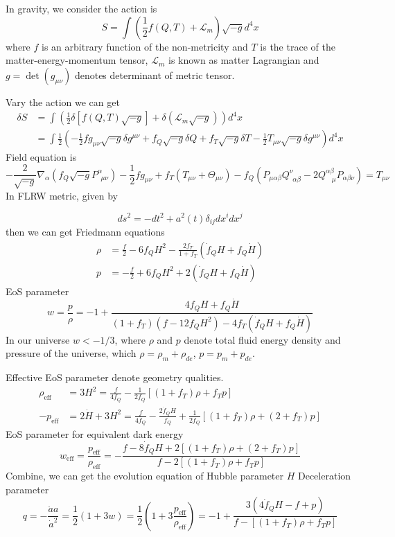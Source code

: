 \documentclass[linenumbers]{aastex631}
\begin{document}
In gravity, we consider the action is
\begin{equation}
S=\int(\frac{1}{2}f(Q,T)+\mathcal{L}_m) \sqrt{-g}  d^4x 
\end{equation}
where $f$ is an arbitrary function of the non-metricity and $T$ is the trace of the matter-energy-momentum tensor, $\mathcal{L}_m$ is known as matter Lagrangian and $g=\det (g_{\mu \nu})$ denotes determinant of metric tensor.

Vary the action we can get
\begin{align}
\delta S&=\int \left(\frac{1}{2} \delta[f(Q,T) \sqrt{-g}]+\delta(\mathcal{L}_m \sqrt{-g})\right)d^4x \\
&= \int \frac{1}{2}\left(-\frac{1}{2}f g_{\mu\nu}\sqrt{-g}\delta g^{\mu\nu}+f_Q \sqrt{-g} \delta Q+f_T \sqrt{-g}\delta T -\frac{1}{2}T_{\mu \nu}\sqrt{-g}\delta g^{\mu\nu}\right)d^4x
\end{align}
Field equation is
\begin{equation}
-\frac{2}{\sqrt{-g}}\nabla_\alpha(f_Q \sqrt{-g}P^\alpha_{\ \ \mu \nu})-\frac{1}{2}f g_{\mu \nu}+f_T(T_{\mu \nu}+\Theta_{\mu \nu})-f_Q(P_{\mu \alpha \beta}Q^\nu_{\ \ \alpha \beta}-2Q^{\alpha \beta}_{\ \ \ \ \mu}P_{\alpha \beta \nu})=T_{\mu \nu}
\end{equation}
In FLRW metric, given by

\begin{equation}
ds^2=-dt^2+a^2(t)\delta_{ij} dx^i dx^j
\end{equation}
then we can get Friedmann equations
\begin{align}
\rho &=\frac{f}{2}-6f_Q H^2-\frac{2f_T}{1+f_T}(\dot{f}_QH+f_Q \dot{H}) \\
p &=-\frac{f}{2}+6f_Q H^2+2(\dot{f}_QH+f_Q \dot{H})
\end{align}
EoS parameter
\begin{equation}
    w=\frac{p}{\rho}=-1+\frac{4 f_Q H+f_Q \dot{H}}{(1+f_T)(f-12f_QH^2)-4 f_T(\dot{f}_QH+f_Q \dot{H})}
\end{equation}
In our universe $w<-1/3$, where $\rho$ and $p$ denote total fluid energy density and pressure of the universe, which $\rho=\rho_m+\rho_{de}$, $p=p_m+p_{de}$.

Effective EoS parameter denote geometry qualities.
\begin{align}
\rho_{\text{eff}}&=3H^2=\frac{f}{4f_Q}-\frac{1}{2f_Q}[(1+f_T)\rho+f_T p]\\
-p_{\text{eff}}&=2\dot{H}+3H^2=\frac{f}{4f_Q}-\frac{2\dot{f}_Q H}{f_Q}+\frac{1}{2f_Q}[(1+f_T)\rho +(2+f_T)p]
\end{align}
EoS parameter for equivalent dark energy
\begin{equation}
w_{\text{eff}}=\frac{p_{\text{eff}}}{\rho_{\text{eff}}} = -\frac{f - 8\dot{f}_Q H + 2[(1 + f_T)\rho + (2 + f_T)p]}{f - 2[(1 + f_T)\rho + f_T p]}
\end{equation}
Combine, we can get the evolution equation of Hubble parameter $H$
Deceleration parameter
\begin{equation}
    q=-\frac{\ddot{a}a}{\dot{a}^2}=\frac{1}{2}(1+3w)=\frac{1}{2}\left(1+3\frac{p_{\text{eff}}}{\rho_{\text{eff}}}\right)=-1+\frac{3(4\dot{f}_QH-f+p)}{f-[(1+f_T)\rho+f_Tp]}
\end{equation}
\end{document}
